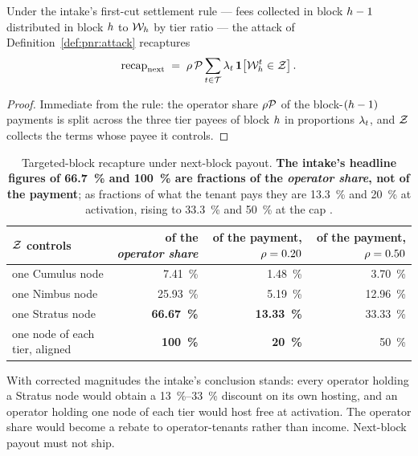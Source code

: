 \begin{proposition}
\label{prop:pnr:nextblock}
Under the intake's first-cut settlement rule --- fees collected in block $h-1$ distributed in
block $h$ to $\mathcal{W}_{h}$ by tier ratio --- the attack of Definition~\ref{def:pnr:attack}
recaptures
\[
  \mathrm{recap}_{\mathrm{next}}
  \;=\; \rho\,\mathcal{P} \sum_{t \in \mathcal{T}} \lambda_{t}\,
        \mathbf{1}\!\left[\mathcal{W}_{h}^{t} \in \mathcal{Z}\right].
\]
\end{proposition}

\begin{proof}
Immediate from the rule: the operator share $\rho\mathcal{P}$ of the block-$(h-1)$ payments is
split across the three tier payees of block $h$ in proportions $\lambda_{t}$, and $\mathcal{Z}$
collects the terms whose payee it controls.
\end{proof}

\begin{table}[H]
\centering
\small
\begin{tabular}{lrrr}
\toprule
$\mathcal{Z}$ controls & of the \emph{operator share} & of the payment, $\rho = 0.20$ & of the payment, $\rho = 0.50$\\
\midrule
one Cumulus node          & \SI{7.41}{\percent}  & \SI{1.48}{\percent}  & \SI{3.70}{\percent}\\
one Nimbus node           & \SI{25.93}{\percent} & \SI{5.19}{\percent}  & \SI{12.96}{\percent}\\
one Stratus node          & \textbf{\SI{66.67}{\percent}} & \textbf{\SI{13.33}{\percent}} & \SI{33.33}{\percent}\\
one node of each tier, aligned & \textbf{\SI{100}{\percent}} & \textbf{\SI{20}{\percent}} & \SI{50}{\percent}\\
\bottomrule
\end{tabular}
\caption{Targeted-block recapture under next-block payout. \textbf{The intake's headline figures
of \SI{66.7}{\percent} and \SI{100}{\percent} are fractions of the \emph{operator share}, not of the
payment}; as fractions of what the tenant pays they are \SI{13.3}{\percent} and \SI{20}{\percent} at
activation, rising to \SI{33.3}{\percent} and \SI{50}{\percent} at the cap
.}
\label{tab:pnr:nextblock}
\end{table}

With corrected magnitudes the intake's conclusion stands: every operator holding a Stratus node
would obtain a \SIrange{13}{33}{\percent} discount on its own hosting, and an operator holding one
node of each tier would host free at activation. The operator share would become a rebate to
operator-tenants rather than income. Next-block payout must not ship.

